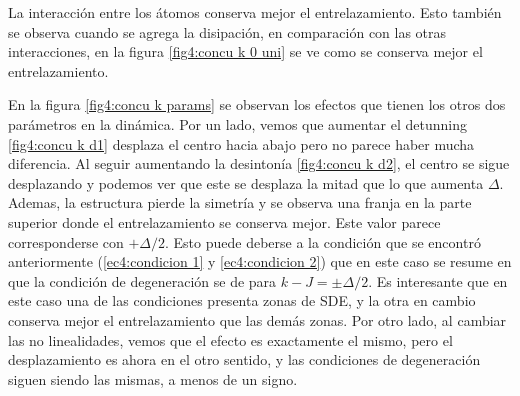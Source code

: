 La interacción entre los átomos conserva mejor el entrelazamiento. Esto también se observa cuando se agrega la disipación, en comparación con las otras interacciones, en la figura \ref{fig4:concu k 0 uni} se ve como se conserva mejor el entrelazamiento.

En la figura \ref{fig4:concu k params} se observan los efectos que tienen los otros dos parámetros en la dinámica. Por un lado, vemos que aumentar el detunning \ref{fig4:concu k d1} desplaza el centro hacia abajo pero no parece haber mucha diferencia. Al seguir aumentando la desintonía \ref{fig4:concu k d2}, el centro se sigue desplazando y podemos ver que este se desplaza la mitad que lo que aumenta $\Delta$. Ademas, la estructura pierde la simetría y se observa una franja en la parte superior donde el entrelazamiento se conserva mejor. Este valor parece corresponderse con $+\Delta/2$. Esto puede deberse a la condición que se encontró anteriormente (\ref{ec4:condicion 1} y \ref{ec4:condicion 2}) que en este caso se resume en que la condición de degeneración se de para $k-J=\pm\Delta/2$. Es interesante que en este caso una de las condiciones presenta zonas de SDE, y la otra en cambio conserva mejor el entrelazamiento que las demás zonas. Por otro lado, al cambiar las no linealidades, vemos que el efecto es exactamente el mismo, pero el desplazamiento es ahora en el otro sentido, y las condiciones de degeneración siguen siendo las mismas, a menos de un signo.
